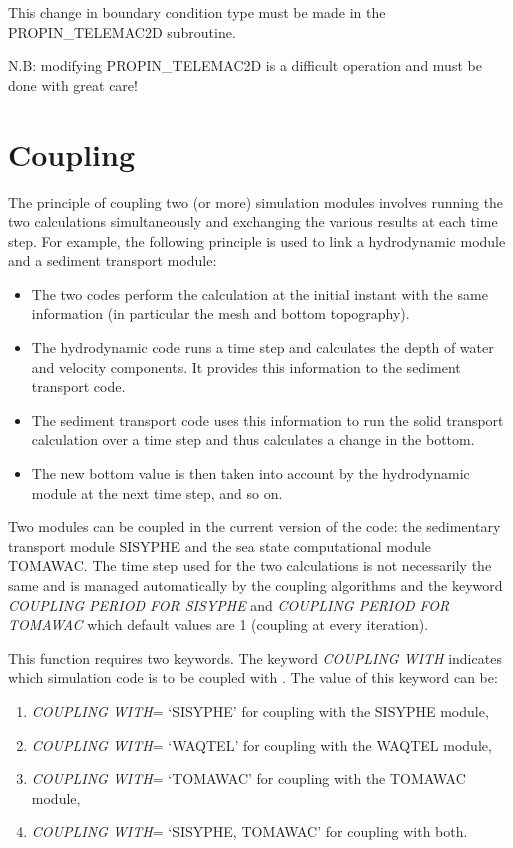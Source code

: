  This change in boundary condition type must be made in the PROPIN\_TELEMAC2D subroutine.

 N.B: modifying PROPIN\_TELEMAC2D is a difficult operation and must be done with great care!


\section{ Coupling}

 The principle of coupling two (or more) simulation modules involves running the two calculations simultaneously and exchanging the various results at each time step. For example, the following principle is used to link a hydrodynamic module and a sediment transport module:

\begin{itemize}
\item  The two codes perform the calculation at the initial instant with the same information (in particular the mesh and bottom topography).

\item  The hydrodynamic code runs a time step and calculates the depth of water and velocity components. It provides this information to the sediment transport code.

\item  The sediment transport code uses this information to run the solid transport calculation over a time step and thus calculates a change in the bottom.

\item  The new bottom value is then taken into account by the hydrodynamic module at the next time step, and so on.
\end{itemize}

 Two modules can be coupled in the current version of the code: the sedimentary transport module SISYPHE and the sea state computational module TOMAWAC. The time step used for the two calculations is not necessarily the same and is managed automatically by the coupling algorithms and the keyword \textit{COUPLING PERIOD FOR SISYPHE} and \textit{COUPLING PERIOD FOR TOMAWAC} which default values are 1 (coupling at every iteration).

 This function requires two keywords. The keyword \textit{COUPLING WITH} indicates which simulation code is to be coupled with . The value of this keyword can be:

\begin{enumerate}
\item  \textit{COUPLING WITH}= `SISYPHE' for coupling with the SISYPHE module,

\item  \textit{COUPLING WITH}= `WAQTEL' for coupling with the WAQTEL module,

\item  \textit{COUPLING WITH}= `TOMAWAC' for coupling with the TOMAWAC module,

\item  \textit{COUPLING WITH}= `SISYPHE, TOMAWAC' for coupling with both.
\end{enumerate}

